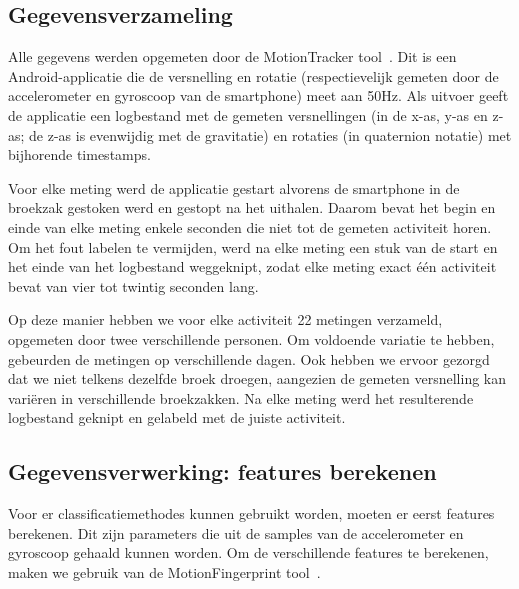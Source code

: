 \documentclass{article}
\begin{document}
\subsection{Gegevensverzameling}

Alle gegevens werden opgemeten door de MotionTracker tool~\cite{meert and schietgat:motiontracker}.
Dit is een Android-applicatie die de versnelling en rotatie (respectievelijk gemeten door de accelerometer en gyroscoop van de smartphone) meet aan 50Hz.  Als uitvoer geeft de applicatie een logbestand met de gemeten versnellingen (in de x-as, y-as en z-as; de z-as is evenwijdig met de gravitatie) en rotaties (in quaternion notatie) met bijhorende timestamps.

Voor elke meting werd de applicatie gestart alvorens de smartphone in de broekzak gestoken werd en gestopt na het uithalen. Daarom bevat het begin en einde van elke meting enkele seconden die niet tot de gemeten activiteit horen. Om het fout labelen te vermijden, werd na elke meting een stuk van de start en het einde van het logbestand weggeknipt, zodat elke meting exact \'e\'en activiteit bevat van vier tot twintig seconden lang. 

Op deze manier hebben we voor elke activiteit 22 metingen verzameld, opgemeten door twee verschillende personen. Om voldoende variatie te hebben, gebeurden de metingen op verschillende dagen. Ook hebben we ervoor gezorgd dat we niet telkens dezelfde broek droegen, aangezien de gemeten versnelling kan vari\"eren in verschillende broekzakken. Na elke meting werd het resulterende logbestand geknipt en gelabeld met de juiste activiteit.

\subsection{Gegevensverwerking: features berekenen}

Voor er classificatiemethodes kunnen gebruikt worden, moeten er eerst features berekenen. Dit zijn parameters die uit de samples van de accelerometer en gyroscoop gehaald kunnen worden. Om de verschillende features te berekenen, maken we gebruik van de MotionFingerprint tool~\cite{meert and schietgat:motionfingerprint}.
\end{document}
